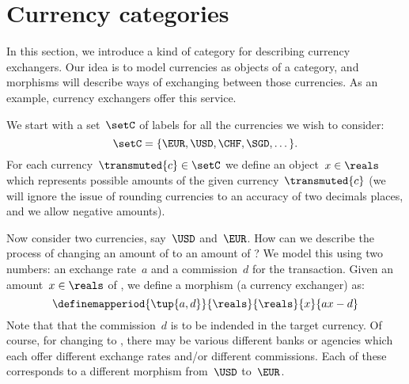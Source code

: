
\section{Currency categories}
\label{sec:currency_cat}
In this section, we introduce a kind of category for describing currency exchangers.
Our idea is to model currencies as objects of a category, and morphisms will describe ways of exchanging between those currencies.
As an example, currency exchangers offer this service.

We start with a set~$\setC$ of labels for all the currencies we wish to consider:
\begin{equation*}
    \setC = \{ \EUR, \USD, \CHF, \SGD, \dots \}.
\end{equation*}
For each currency~$\transmuted{c} \in \setC$ we define an object~$x\in \reals$ which represents possible amounts of the given currency~$\transmuted{c}$ (we will ignore the issue of rounding currencies to an accuracy of two decimals places, and we allow negative amounts).


Now consider two currencies, say~$\USD$ and~$\EUR$.
How can we describe the process of changing an amount of \USD to an amount of \EUR?
We model this using two numbers: an exchange rate~$a$ and a commission~$d$ for the transaction.
Given an amount~$x \in \reals$ of \USD, we define a morphism (a currency exchanger) as:
\begin{equation*}
    \label{eq:def_curr_ex}
    \definemapperiod{\tup{a,d}}{\reals}{\reals}{x}{ax-d}
\end{equation*}
Note that that the commission~$d$ is to be indended in the target currency.
Of course, for changing \USD to \EUR, there may be various different banks or agencies which each offer different exchange rates and/or different commissions.
Each of these corresponds to a different morphism from~$\USD$ to~$\EUR$.

